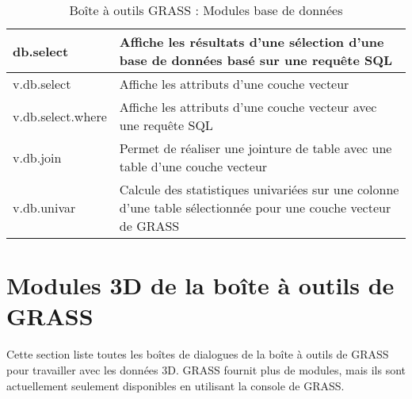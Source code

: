 \begin{table}[H]
\begin{tabular}{|p{4cm}|p{10cm}|}
  \hline db.select & Affiche les résultats d'une sélection d'une base de données basé sur une requ\^ete SQL\\
  \hline v.db.select & Affiche les attributs d'une couche vecteur\\
  \hline v.db.select.where & Affiche les attributs d'une couche vecteur avec une requ\^ete SQL\\
  \hline v.db.join & Permet de réaliser une jointure de table avec une table d'une couche vecteur\\
  \hline v.db.univar & Calcule des statistiques univariées sur une colonne d'une table sélectionnée pour une couche vecteur de GRASS\\
\hline
\end{tabular}
\caption{Boîte à outils GRASS : Modules base de données}
\end{table}

\newpage

\section{Modules 3D de la boîte à outils de GRASS}

Cette section liste toutes les boîtes de dialogues de la boîte à outils de GRASS pour travailler avec les données 3D. GRASS fournit plus de modules, mais ils sont actuellement seulement disponibles en utilisant la console de GRASS.

